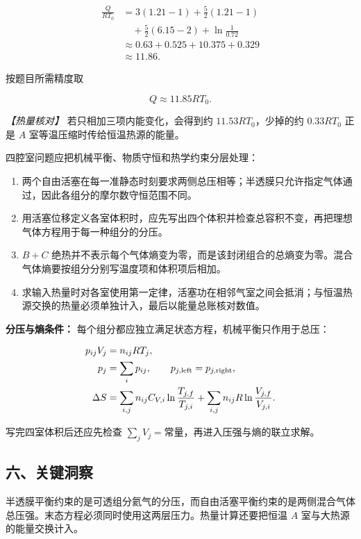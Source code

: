 \documentclass[12pt,a4paper,UTF8]{ctexart}
\newcommand{\tightlist}{\setlength{\itemsep}{0pt}\setlength{\parskip}{0pt}}
\begin{document}
\[\begin{aligned}
\frac{Q}{RT_0}
&=3(1.21-1)+\frac52(1.21-1)\\
&\quad+\frac52(6.15-2)+\ln\frac1{0.72}\\
&\approx0.63+0.525+10.375+0.329\\
&\approx11.86.
\end{aligned}\]

按题目所需精度取

\[\boxed{Q\approx11.85RT_0}. \tag{88}\]

\emph{【热量核对】} 若只相加三项内能变化，会得到约
\(11.53RT_0\)，少掉的约 \(0.33RT_0\) 正是 \(A\)
室等温压缩时传给恒温热源的能量。

四腔室问题应把机械平衡、物质守恒和热学约束分层处理：

\begin{enumerate}
\def\labelenumi{\arabic{enumi}.}
\tightlist
\item
  两个自由活塞在每一准静态时刻要求两侧总压相等；半透膜只允许指定气体通过，因此各组分的摩尔数守恒范围不同。
\item
  用活塞位移定义各室体积时，应先写出四个体积并检查总容积不变，再把理想气体方程用于每一种组分的分压。
\item
  \(B+C\)
  绝热并不表示每个气体熵变为零，而是该封闭组合的总熵变为零。混合气体熵要按组分分别写温度项和体积项后相加。
\item
  求输入热量时对各室使用第一定律，活塞功在相邻气室之间会抵消；与恒温热源交换的热量必须单独计入，最后以能量总账核对数值。
\end{enumerate}

\textbf{分压与熵条件：}
每个组分都应独立满足状态方程，机械平衡只作用于总压：

\[\begin{aligned}
p_{ij}V_j&=n_{ij}RT_j,\\
p_j&=\sum_i p_{ij},\qquad p_{j,\rm left}=p_{j,\rm right},\\
\Delta S&=\sum_{i,j}n_{ij}C_{V,i}
\ln\frac{T_{j,f}}{T_{j,i}}
+\sum_{i,j}n_{ij}R\ln\frac{V_{j,f}}{V_{j,i}}.
\end{aligned}\]

写完四室体积后还应先检查
\(\sum_jV_j=\text{常量}\)，再进入压强与熵的联立求解。

\subsection{六、关键洞察}\label{ux516dux5173ux952eux6d1eux5bdf-5}

半透膜平衡约束的是可透组分氦气的分压，而自由活塞平衡约束的是两侧混合气体总压强。末态方程必须同时使用这两层压力。热量计算还要把恒温
\(A\) 室与大热源的能量交换计入。
\end{document}
